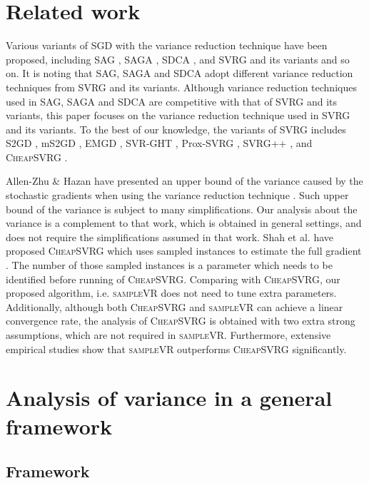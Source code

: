 \documentclass[letterpaper]{article}
\begin{document}
\section{Related work}
\label{sect_related_work}
Various variants of  SGD with the variance reduction technique have been proposed, including SAG \cite{Schmidt:2013ui}, SAGA \cite{Defazio:2014vu}, SDCA \cite{ShalevShwartz:2016vy}, and SVRG \cite{Johnson:9MAvkbgy} and its variants and so on. It is noting that SAG, SAGA and SDCA adopt different variance reduction techniques from SVRG and its variants. Although variance reduction techniques used in SAG, SAGA and SDCA are competitive with that of SVRG and its variants,  this paper focuses on the variance reduction technique used in SVRG and its variants. To the best of our knowledge,  the variants of SVRG includes S2GD \cite{Richtarik:2013te}, mS2GD \cite{Liu:2015bx}, EMGD \cite{Zhang2013Linear}, SVR-GHT \cite{Li:2016vh}, Prox-SVRG \cite{Xiao:2014vw}, SVRG++ \cite{Allen2015Improved}, and \textsc{CheapSVRG} \cite{Shah2016Trading}. 

Allen-Zhu \& Hazan have presented an upper bound of the variance caused by the stochastic gradients when using the variance reduction technique \cite{AllenZhu:2016up}. Such upper bound of the variance is subject to  many simplifications. Our analysis about the variance is a complement to that work, which is obtained in general settings, and does not require the simplifications assumed in that work. Shah et al. have proposed \textsc{CheapSVRG} which uses sampled instances to estimate the full gradient \cite{Shah2016Trading}. The number of those sampled instances is a parameter which needs to be identified before running of \textsc{CheapSVRG}. Comparing with \textsc{CheapSVRG}, our proposed algorithm, i.e. \textsc{sampleVR} does not need to tune extra parameters. Additionally, although both \textsc{CheapSVRG} and \textsc{sampleVR} can achieve a linear convergence rate, the analysis of \textsc{CheapSVRG} is obtained with two extra strong assumptions, which are not required in \textsc{sampleVR}. Furthermore, extensive empirical studies show that  \textsc{sampleVR} outperforms \textsc{CheapSVRG} significantly.
 

\section{Analysis of variance in a  general framework}
\label{sect_framework}
\subsection{Framework}
\end{document}
